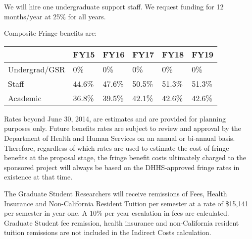 \documentclass[onecolumn,11pt]{aastex}
\begin{document}
We will hire one undergraduate support staff.  We request funding for 12 months/year at 25\% for all years.

Composite Fringe benefits are:
\begin{table}
\begin{tabular}{| l | l | l | l | l | l |}
\hline
            ~ & FY15    & FY16    & FY17   & FY18   & FY19 \\ \hline \hline
Undergrad/GSR &	0\%     & 0\%     & 0\%    & 0\%    &  0\% \\ \hline
Staff         & 44.6\%  & 47.6\%  & 50.5\% & 51.3\% &  51.3\% \\ \hline
Academic      & 36.8\%  & 39.5\%  & 42.1\% & 42.6\% &   42.6\% \\ \hline
\hline
\end{tabular}
\label{tab:fringeBenefits}
\end{table}

Rates beyond June 30, 2014, are estimates and are provided for planning purposes only. Future benefits rates are subject to review and approval by the Department of Health and Human Services on an annual or bi-annual basis. Therefore, regardless of which rates are used to estimate the cost of fringe benefits at the proposal stage, the fringe benefit costs ultimately charged to the sponsored project will always be based on the DHHS-approved fringe rates in existence at that time.

The Graduate Student Researchers will receive remissions of Fees, Health Insurance and Non-California Resident Tuition per semester at a rate of \$15,141 per semester in year one.  A 10\% per year escalation in fees are calculated.  Graduate Student fee remission, health insurance and non-California resident tuition remissions are not included in the Indirect Costs calculation. 
\end{document}
